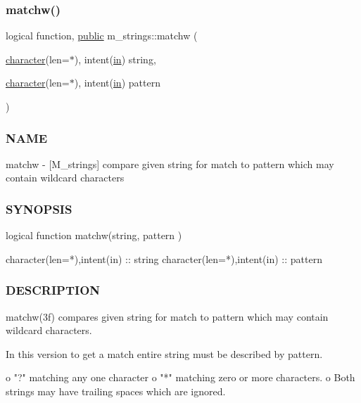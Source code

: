 \subsubsection{\texorpdfstring{matchw()}{matchw()}}
{\footnotesize\ttfamily logical function, \hyperlink{M__stopwatch_83_8txt_a2f74811300c361e53b430611a7d1769f}{public} m\+\_\+strings\+::matchw (\begin{DoxyParamCaption}\item[{\hyperlink{option__stopwatch_83_8txt_abd4b21fbbd175834027b5224bfe97e66}{character}(len=$\ast$), intent(\hyperlink{M__journal_83_8txt_afce72651d1eed785a2132bee863b2f38}{in})}]{string,  }\item[{\hyperlink{option__stopwatch_83_8txt_abd4b21fbbd175834027b5224bfe97e66}{character}(len=$\ast$), intent(\hyperlink{M__journal_83_8txt_afce72651d1eed785a2132bee863b2f38}{in})}]{pattern }\end{DoxyParamCaption})}



\subsubsection*{N\+A\+ME}

matchw -\/ \mbox{[}M\+\_\+strings\mbox{]} compare given string for match to pattern which may contain wildcard characters 

\subsubsection*{S\+Y\+N\+O\+P\+S\+IS}

\begin{DoxyVerb}logical function matchw(string, pattern )

 character(len=*),intent(in) :: string
 character(len=*),intent(in) :: pattern
\end{DoxyVerb}


\subsubsection*{D\+E\+S\+C\+R\+I\+P\+T\+I\+ON}

\begin{DoxyVerb}matchw(3f) compares given string for match to pattern which may
contain wildcard characters.

In this version to get a match entire string must be described by pattern.

   o  "?" matching any one character
   o  "*" matching zero or more characters.
   o  Both strings may have trailing spaces which are ignored.
\end{DoxyVerb}


